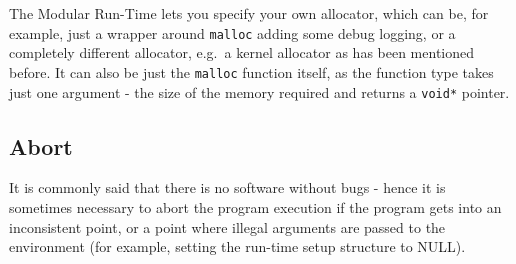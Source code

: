 The Modular Run-Time lets you specify your own allocator, which can be, for example, just a wrapper around \verb=malloc= adding some debug logging, or a completely different allocator, e.g.\ a kernel allocator as has been mentioned before. It can also be just the \verb=malloc= function itself, as the function type takes just one argument - the size of the memory required and returns a \verb=void*= pointer.

\subsection{Abort}

It is commonly said that there is no software without bugs - hence it is sometimes necessary to abort the program execution if the program gets into an inconsistent point, or a point where illegal arguments are passed to the environment (for example, setting the run-time setup structure to NULL).
